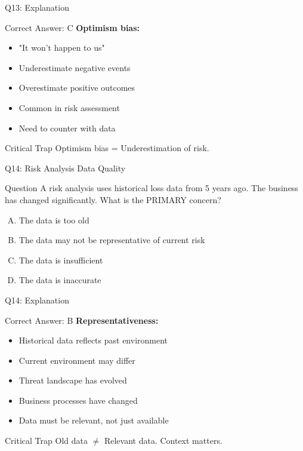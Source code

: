 \documentclass{beamer}
\begin{document}
			\begin{frame}{Q13: Explanation}
				\begin{block}{Correct Answer: C}
					\textbf{Optimism bias:}
					\begin{itemize}
						\item "It won't happen to us"
						\item Underestimate negative events
						\item Overestimate positive outcomes
						\item Common in risk assessment
						\item Need to counter with data
					\end{itemize}
				\end{block}
				\begin{alertblock}{Critical Trap}
					Optimism bias = Underestimation of risk.
				\end{alertblock}
			\end{frame}
			
			\begin{frame}{Q14: Risk Analysis Data Quality}
				\begin{block}{Question}
					A risk analysis uses historical loss data from 5 years ago. The business has changed significantly. What is the PRIMARY concern?
				\end{block}
				\begin{enumerate}[(A)]
					\item The data is too old
					\item The data may not be representative of current risk
					\item The data is insufficient
					\item The data is inaccurate
				\end{enumerate}
			\end{frame}
			
			\begin{frame}{Q14: Explanation}
				\begin{block}{Correct Answer: B}
					\textbf{Representativeness:}
					\begin{itemize}
						\item Historical data reflects past environment
						\item Current environment may differ
						\item Threat landscape has evolved
						\item Business processes have changed
						\item Data must be relevant, not just available
					\end{itemize}
				\end{block}
				\begin{alertblock}{Critical Trap}
					Old data $\neq$ Relevant data. Context matters.
				\end{alertblock}
			\end{frame}
			
\end{document}
